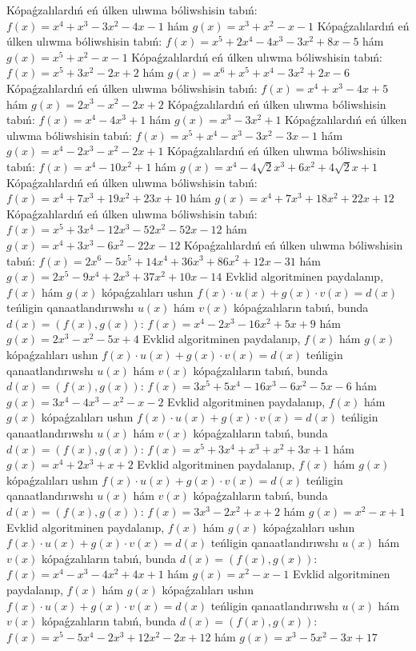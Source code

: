 Kópaǵzalılardıń eń úlken ulıwma bóliwshisin tabıń:  $f(x)=x^4+x^3-3 x^2-4 x-1$ hám $g(x)=x^3+x^2-x-1$
Kópaǵzalılardıń eń úlken ulıwma bóliwshisin tabıń:  $f(x)=x^5+2 x^4-4 x^3-3 x^2+8 x-5$ hám $g(x)=x^5+x^2-x-1$
Kópaǵzalılardıń eń úlken ulıwma bóliwshisin tabıń:  $f(x)=x^5+3 x^2-2 x+2$ hám $g(x)=x^6+x^5+x^4-3 x^2+2 x-6$
Kópaǵzalılardıń eń úlken ulıwma bóliwshisin tabıń:  $f(x)=x^4+x^3-4 x+5$ hám $g(x)=2 x^3-x^2-2 x+2$
Kópaǵzalılardıń eń úlken ulıwma bóliwshisin tabıń:  $f(x)=x^4-4 x^3+1$ hám $g(x)=x^3-3 x^2+1$
Kópaǵzalılardıń eń úlken ulıwma bóliwshisin tabıń: $f(x)=x^5+x^4-x^3-3 x^2-3 x-1$ hám $g(x)=x^4-2 x^3-x^2-2 x+1$
Kópaǵzalılardıń eń úlken ulıwma bóliwshisin tabıń:  $f(x)=x^4-10 x^2+1$ hám $g(x)=x^4-4 \sqrt{2} x^3+6 x^2+4 \sqrt{2} x+1$
Kópaǵzalılardıń eń úlken ulıwma bóliwshisin tabıń:  $f(x)=x^4+7 x^3+19 x^2+23 x+10$ hám $g(x)=x^4+7 x^3+18 x^2+22 x+12$
Kópaǵzalılardıń eń úlken ulıwma bóliwshisin tabıń:  $f(x)=x^5+3 x^4-12 x^3-52 x^2-52 x-12$ hám $g(x)=x^4+3 x^3-6 x^2-22 x-12$
Kópaǵzalılardıń eń úlken ulıwma bóliwshisin tabıń:  $f(x)=2 x^6-5 x^5+14 x^4+36 x^3+86 x^2+12 x-31$ hám $g(x)=2 x^5-9 x^4+2 x^3+37 x^2+10 x-14$
Evklid algoritminen paydalanıp, $f(x)$ hám $g(x)$ kópaǵzalıları ushın $f(x) \cdot u(x)+g(x) \cdot v(x)=d(x)$ teńligin qanaatlandırıwshı $u(x)$ hám $v(x)$ kópaǵzalıların tabıń, bunda $d(x)=(f(x), g(x))$:  $f(x)=x^4-2 x^3-16 x^2+5 x+9$ hám $g(x)=2 x^3-x^2-5 x+4$
Evklid algoritminen paydalanıp, $f(x)$ hám $g(x)$ kópaǵzalıları ushın $f(x) \cdot u(x)+g(x) \cdot v(x)=d(x)$ teńligin qanaatlandırıwshı $u(x)$ hám $v(x)$ kópaǵzalıların tabıń, bunda $d(x)=(f(x), g(x))$:  $f(x)=3 x^5+5 x^4-16 x^3-6 x^2-5 x-6$ hám $g(x)=3 x^4-4 x^3-x^2-x-2$
Evklid algoritminen paydalanıp, $f(x)$ hám $g(x)$ kópaǵzalıları ushın $f(x) \cdot u(x)+g(x) \cdot v(x)=d(x)$ teńligin qanaatlandırıwshı $u(x)$ hám $v(x)$ kópaǵzalıların tabıń, bunda $d(x)=(f(x), g(x))$:  $f(x)=x^5+3 x^4+x^3+x^2+3 x+1$ hám $g(x)=x^4+2 x^3+x+2$
Evklid algoritminen paydalanıp, $f(x)$ hám $g(x)$ kópaǵzalıları ushın $f(x) \cdot u(x)+g(x) \cdot v(x)=d(x)$ teńligin qanaatlandırıwshı $u(x)$ hám $v(x)$ kópaǵzalıların tabıń, bunda $d(x)=(f(x), g(x))$:  $f(x)=3 x^3-2 x^2+x+2$ hám $g(x)=x^2-x+1$
Evklid algoritminen paydalanıp, $f(x)$ hám $g(x)$ kópaǵzalıları ushın $f(x) \cdot u(x)+g(x) \cdot v(x)=d(x)$ teńligin qanaatlandırıwshı $u(x)$ hám $v(x)$ kópaǵzalıların tabıń, bunda $d(x)=(f(x), g(x))$:  $f(x)=x^4-x^3-4 x^2+4 x+1$ hám $g(x)=x^2-x-1$
Evklid algoritminen paydalanıp, $f(x)$ hám $g(x)$ kópaǵzalıları ushın $f(x) \cdot u(x)+g(x) \cdot v(x)=d(x)$ teńligin qanaatlandırıwshı $u(x)$ hám $v(x)$ kópaǵzalıların tabıń, bunda $d(x)=(f(x), g(x))$:  $f(x)=x^5-5 x^4-2 x^3+12 x^2-2 x+12$ hám $g(x)=x^3-5 x^2-3 x+17$
